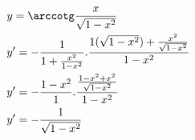 \begin{ex}
\begin{align}
&y=\arccotg \frac{x}{\sqrt{1-x^2}}\nonumber\\
&y'=-\frac{1}{1+\frac{x^2}{1-x^2}}.\frac{1(\sqrt{1-x^2})+\frac{x^2}{\sqrt{1-x^2}}}{1-x^2}\nonumber\\
&y'=-\frac{1-x^2}{1}.\frac{\frac{1-x^2+x^2}{\sqrt{1-x^2}}}{1-x^2}\nonumber\\
&y'=-\frac{1}{\sqrt{1-x^2}}\nonumber
\end{align}
\end{ex}